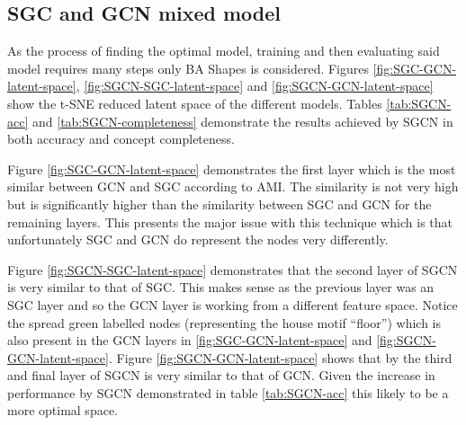 \subsection{SGC and GCN mixed model}
\label{sec:SGCN}



As the process of finding the optimal model, training and then evaluating said model requires many steps only BA Shapes is considered.
Figures \ref{fig:SGC-GCN-latent-space}, \ref{fig:SGCN-SGC-latent-space} and \ref{fig:SGCN-GCN-latent-space} show the t-SNE reduced latent space of the different models.
Tables \ref{tab:SGCN-acc} and \ref{tab:SGCN-completeness} demonstrate the results achieved by SGCN in both accuracy and concept completeness.

Figure \ref{fig:SGC-GCN-latent-space} demonstrates the first layer which is the most similar between GCN and SGC according to AMI.
The similarity is not very high but is significantly higher than the similarity between SGC and GCN for the remaining layers.
This presents the major issue with this technique which is that unfortunately SGC and GCN do represent the nodes very differently.

Figure \ref{fig:SGCN-SGC-latent-space} demonstrates that the second layer of SGCN is very similar to that of SGC.
This makes sense as the previous layer was an SGC layer and so the GCN layer is working from a different feature space.
Notice the spread green labelled nodes (representing the house motif ``floor'') which is also present in the GCN layers in \ref{fig:SGC-GCN-latent-space} and \ref{fig:SGCN-GCN-latent-space}.
Figure \ref{fig:SGCN-GCN-latent-space} shows that by the third and final layer of SGCN is very similar to that of GCN.
Given the increase in performance by SGCN demonstrated in table \ref{tab:SGCN-acc} this likely to be a more optimal space.


